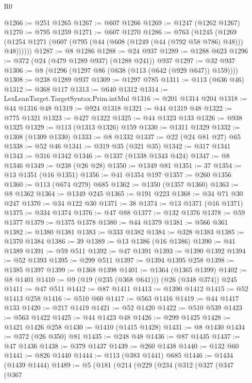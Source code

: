 \begin{lexlean}{R0}
\begin{coremodule}
@1266 := @251 @1265
@1267 := @607 @1266
@1269 := @1247 (@1262 @1267)
@1270 := @795 @1259
@1271 := @607 @1270
@1286 := @763
    (@1245 (@1269 (@1254 @1271 (@607 (@795 (@44 (@608 (@1249 (@44 (@792 @58 @786) @48))) @48))))))
@1287 := @8 @1286
@1288 := @24 @937
@1289 := @1288 @623
@1296 := @372 (@24 (@479 @1289 @937) (@1288 @241)) @937
@1297 := @32 @937
@1306 := @8 (@1296 (@1297 @86 (@638 (@113 (@642 (@929 @647)) @159))))
@1308 := @238 @1289 @937
@1309 := @1297 @785
@1311 := @113 (@636 @46)
@1312 := @368 @117
@1313 := @640 @1312
@1314 := LexLeanTarget.TargetSyntax.Prim.intMul
@1316 := @201 @1314 @204
@1318 := @44 @1316 @48
@1319 := @924 @1318
@1321 := @44 @1319 @48
@1322 := @775 @1321
@1323 := @427 @1322
@1325 := @44 @1323 @133
@1326 := @938 @1325
@1329 := @113 (@1313 @1326) @159
@1330 := @1311 @1329
@1332 := @1308 (@1309 @1330)
@1333 := @8 @1332
@1337 := @22 (@24 @81 @27) @65
@1338 := @52 @46
@1341 := @319 @35 (@321 @35)
@1342 := @317 @1341
@1343 := @316 @1342
@1346 := @1337 (@1338 @1343 @424)
@1347 := @8 @1346
@1349 := @238 (@26 @28)
@1350 := @1349 @81
@1351 := 37
@1354 := @13 @1351 (@16 @1351)
@1356 := @41 @1354 @197
@1357 := @260 @1356
@1360 := @113 (@674 @279) @685
@1362 := @1350 (@1357 @1360)
@1363 := @8 @1362
@1364 := @1349 @245
@1365 := @191 @223
@1368 := @34 @71 @30 @247
@1370 := @34 @122 @30
@1371 := 38
@1374 := @13 @1371 (@16 @1371)
@1375 := @334 @1374
@1376 := @47 @88
@1377 := @132 @1376
@1378 := @59 @1377
@1379 := @1375 @1378
@1380 := @44 @1379
@1381 := @566 @361
@1382 := @1380 @1381
@1383 := @333 @1382
@1384 := @328 @1383
@1385 := @1370 @1384
@1386 := 39
@1389 := @13 @1386 (@16 @1386)
@1390 := @41 @1389
@1391 := @59 @511
@1392 := @47 @1391
@1393 := @1390 @1392
@1394 := @52 @1393
@1395 := @299 @511
@1397 := @1394 @1395 @258
@1398 := @1385 @1397
@1399 := @1368 @1398
@1401 := @1364 (@1365 @1399)
@1402 := @8 @1401
@1410 := @9 (@19 (@235 (@368 @641))) (@26 (@348 @374)) @245
@1411 := @47 @511
@1412 := @87 @1411
@1413 := @1390 @1412
@1415 := @52 @1413 @258
@1416 := @510 @60
@1417 := @563 @1416
@1419 := @44 @1417 @133
@1420 := @217 @1419
@1421 := @52 @1420
@1422 := @510 @539
@1423 := @563 @1422
@1425 := @44 @1423 @48
@1426 := @299 @1425
@1428 := @1421 @1426 @258
@1430 := @1410 (@1415 @1428)
@1431 := @8 @1430
@1434 := @372 (@26 @350) @81
@1435 := @248 @48
@1436 := @87 @1435
@1437 := @47 @1436
@1438 := @379 @1437
@1439 := @260 @1438
@1440 := @132 @60
@1441 := @826 @1440
@1444 := @113 (@383 @1441) @685
@1446 := @1434 (@1439 @1444)
@1489 := @5
    (@181
      (@214
        (@229
          (@234
            (@312
              (@327
                (@347
                  (@367

\end{coremodule}
\end{lexlean}
